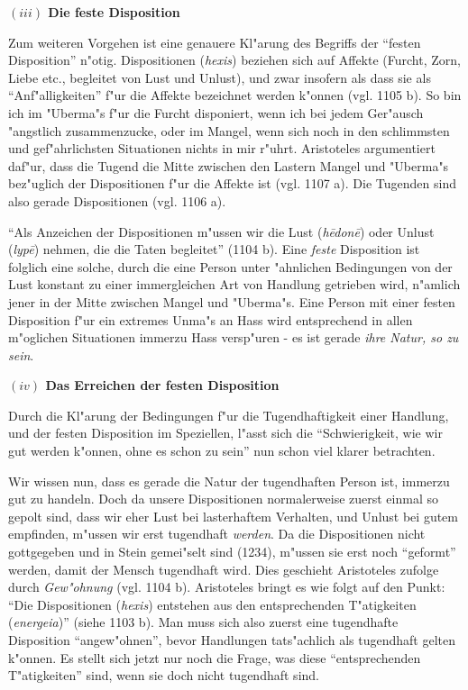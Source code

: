 \documentclass[a4paper, emulatestandardclasses, 12pt]{scrartcl}
\begin{document}
\begin{onehalfspace}
\vspace{5mm}
\noindent\textbf{$(iii)$ Die feste Disposition}	

\noindent Zum weiteren Vorgehen ist eine genauere Kl"arung des Begriffs der "`festen Disposition"' n"otig. Dispositionen (\emph{hexis}) beziehen sich auf Affekte (Furcht, Zorn, Liebe etc., begleitet von Lust und Unlust), und zwar insofern als dass sie als "`Anf"alligkeiten"' f"ur die Affekte bezeichnet werden k"onnen (vgl. 1105 b). So bin ich im "Uberma"s f"ur die Furcht disponiert, wenn ich bei jedem Ger"ausch "angstlich zusammenzucke, oder im Mangel, wenn sich noch in den schlimmsten und gef"ahrlichsten Situationen nichts in mir r"uhrt. Aristoteles argumentiert daf"ur, dass die Tugend die Mitte zwischen den Lastern Mangel und "Uberma"s bez"uglich der Dispositionen f"ur die Affekte ist (vgl. 1107 a). Die Tugenden sind also gerade Dispositionen (vgl. 1106 a).

"`Als Anzeichen der Dispositionen m"ussen wir die Lust (\emph{h\={e}don\={e}}) oder Unlust (\emph{lyp\={e}}) nehmen, die die Taten begleitet"' (1104 b). Eine \emph{feste} Disposition ist folglich eine solche, durch die eine Person unter "ahnlichen Bedingungen von der Lust konstant zu einer immergleichen Art von Handlung getrieben wird, n"amlich jener in der Mitte zwischen Mangel und "Uberma"s. Eine Person mit einer festen Disposition f"ur ein extremes Unma"s an Hass wird entsprechend in allen m"oglichen Situationen immerzu Hass versp"uren - es ist gerade \emph{ihre Natur, so zu sein}. 

\vspace{5mm}
\noindent\textbf{$(iv)$ Das Erreichen der festen Disposition}	

\noindent Durch die Kl"arung der Bedingungen f"ur die Tugendhaftigkeit einer Handlung, und der festen Disposition im Speziellen, l"asst sich die "`Schwierigkeit, wie wir gut werden k"onnen, ohne es schon zu sein"' nun schon viel klarer betrachten. 

Wir wissen nun, dass es gerade die Natur der tugendhaften Person ist, immerzu gut zu handeln. Doch da unsere Dispositionen normalerweise zuerst einmal so gepolt sind, dass wir eher Lust bei lasterhaftem Verhalten, und Unlust bei gutem empfinden, m"ussen wir erst tugendhaft \emph{werden}. Da die Dispositionen nicht gottgegeben und in Stein gemei"selt sind (1234), m"ussen sie erst noch "`geformt"' werden, damit der Mensch tugendhaft wird. Dies geschieht Aristoteles zufolge durch \emph{Gew"ohnung} (vgl. 1104 b). Aristoteles bringt es wie folgt auf den Punkt: "`Die Dispositionen (\emph{hexis}) entstehen aus den entsprechenden T"atigkeiten (\emph{energeia})"' (siehe 1103 b). Man muss sich also zuerst eine tugendhafte Disposition "`angew"ohnen"', bevor Handlungen tats"achlich als tugendhaft gelten k"onnen. Es stellt sich jetzt nur noch die Frage, was diese "`entsprechenden T"atigkeiten"' sind, wenn sie doch nicht tugendhaft sind. 


\end{onehalfspace}
\end{document}
